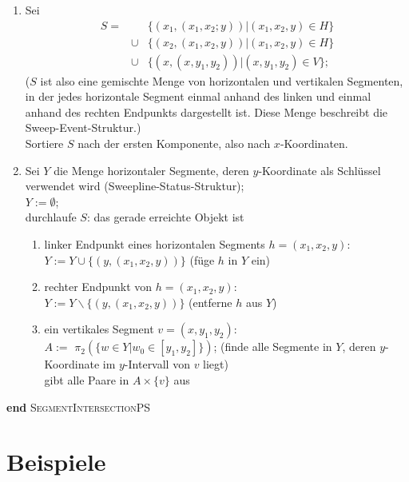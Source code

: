 \documentclass[ngerman]{scrreprt}%
\theoremstyle{break}
\begin{document}
\begin{enumerate}
\item
Sei \begin{displaymath}
  \begin{array}{rcl}
  S =&& \{(x_1, (x_1,x_2;y)) | (x_1,x_2,y)\in H\}\\
  &\cup& \{(x_2,(x_1,x_2,y)) | (x_1,x_2,y)\in H\}\\
  &\cup& \{(x,(x,y_1,y_2)) | (x,y_1,y_2)\in V\};
\end{array}
\end{displaymath}
($S$ ist also eine gemischte Menge von horizontalen und vertikalen Segmenten,
in der jedes horizontale Segment einmal anhand des linken und einmal
anhand des rechten Endpunkts dargestellt ist. Diese Menge beschreibt die
Sweep-Event-Struktur.)\\
Sortiere $S$ nach der ersten Komponente, also nach $x$-Koordinaten.

\item
Sei $Y$ die Menge horizontaler Segmente, deren $y$-Koordinate als
Schlüssel verwendet wird (Sweepline-Status-Struktur);\\
$Y:=\emptyset$;\\
durchlaufe $S$: das gerade erreichte Objekt ist
\begin{enumerate}
\item
linker Endpunkt eines horizontalen Segments $h=(x_1,x_2,y)$:\\
$Y := Y \cup \{(y,(x_1,x_2,y))\}$ (füge $h$ in $Y$ ein)
\item
rechter Endpunkt von $h=(x_1,x_2,y)$:\\
$Y := Y \backslash \{(y,(x_1,x_2,y))\}$ (entferne $h$ aus $Y$)
\item
ein vertikales Segment $v=(x,y_1,y_2)$:\\
$A :=$ 
$\pi_2 (\{w\in Y | w_0 \in [y_1,y_2] \})$;
 \hspace{1cm}  (finde alle Segmente in $Y$, deren
   $y$-Koordinate im $y$-Intervall von $v$ liegt)\\
gibt alle Paare in $A\times\{v\}$ aus
\end{enumerate}
\end{enumerate}
\textbf{end} \textsc{SegmentIntersectionPS} 

\chapter{Beispiele}
\end{document}
